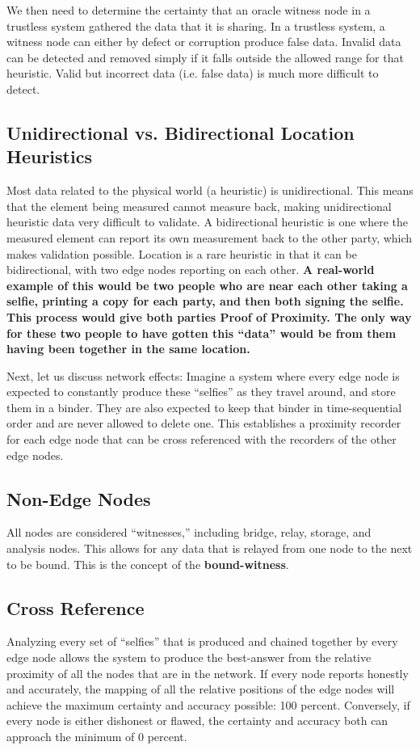 \documentclass{article}
\begin{document}
We then need to determine the certainty that an oracle witness node in a \gls{trustless} system gathered the data that it is sharing. In a trustless system, a witness node can either by defect or corruption produce false data. Invalid data can be detected and removed simply if it falls outside the allowed range for that heuristic. Valid but incorrect data (i.e. false data) is much more difficult to detect.

\subsection {Unidirectional vs. Bidirectional Location Heuristics}
Most data related to the physical world (a \gls{heuristic}) is unidirectional. This means that the element being measured cannot measure back, making unidirectional heuristic data very difficult to validate. A bidirectional heuristic is one where the measured element can report its own measurement back to the other party, which makes validation possible. Location is a rare heuristic in that it can be bidirectional, with two edge nodes reporting on each other. \textbf{A real-world example of this would be two people who are near each other taking a selfie, printing a copy for each party, and then both signing the selfie. This process would give both parties Proof of Proximity. The only way for these two people to have gotten this ``data'' would be from them having been together in the same location.}

Next, let us discuss network effects: Imagine a system where every edge node is expected to constantly produce these ``selfies'' as they travel around, and store them in a binder. They are also expected to keep that binder in time-sequential order and are never allowed to delete one. This establishes a proximity recorder for each edge node that can be cross referenced with the recorders of the other edge nodes.

\subsection {Non-Edge Nodes}
All nodes are considered ``witnesses,'' including bridge, relay, storage, and analysis nodes. This allows for any data that is relayed from one node to the next to be bound. This is the concept of the \textbf{\Gls{bound-witness}}.

\subsection {Cross Reference}
Analyzing every set of ``selfies'' that is produced and chained together by every edge node allows the system to produce the \Gls{best-answer} from the relative proximity of all the nodes that are in the network. If every node reports honestly and accurately, the mapping of all the relative positions of the edge nodes will achieve the maximum \gls{certainty} and \gls{accuracy} possible: 100 percent. Conversely, if every node is either dishonest or flawed, the certainty and accuracy both can approach the minimum of 0 percent.
\end{document}
